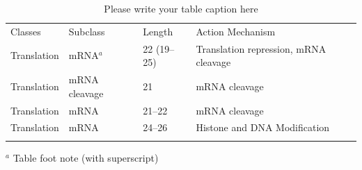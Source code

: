 \documentclass[graybox,envcountchap,sectrefs]{svmono}
\begin{document}
%
\begin{table}
	\caption{Please write your table caption here}
	\label{tab:A1}       %
	\begin{tabular}{p{2cm}p{2.4cm}p{2cm}p{4.9cm}}
		\hline\noalign{\smallskip}
		Classes & Subclass & Length & Action Mechanism  \\
		\noalign{\smallskip}\hline\noalign{\smallskip}
		Translation & mRNA$^a$  & 22 (19--25) & Translation repression, mRNA cleavage\\
		Translation & mRNA cleavage & 21 & mRNA cleavage\\
		Translation & mRNA  & 21--22 & mRNA cleavage\\
		Translation & mRNA  & 24--26 & Histone and DNA Modification\\
		\noalign{\smallskip}\hline\noalign{\smallskip}
	\end{tabular}
	$^a$ Table foot note (with superscript)
\end{table}
%
\end{document}
